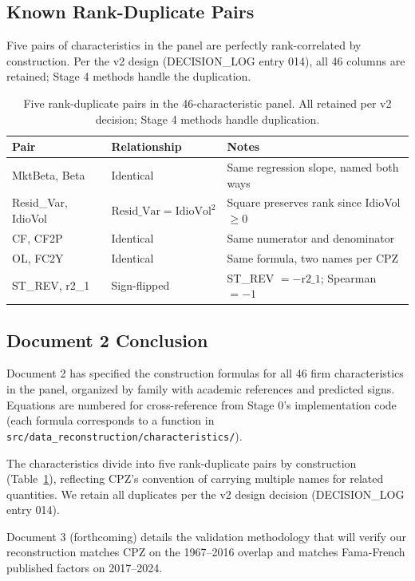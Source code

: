 \subsection{Known Rank-Duplicate Pairs}
\label{subsec:stage0-duplicates}

Five pairs of characteristics in the panel are perfectly rank-correlated
by construction. Per the v2 design (DECISION\_LOG entry 014), all 46
columns are retained; Stage 4 methods handle the duplication.

\begin{table}[!ht]
\centering
\small
\begin{tabular}{lll}
\toprule
\textbf{Pair} & \textbf{Relationship} & \textbf{Notes} \\
\midrule
MktBeta, Beta & Identical & Same regression slope, named both ways \\
Resid\_Var, IdioVol & $\mathrm{Resid\_Var} = \mathrm{IdioVol}^2$ &
   Square preserves rank since IdioVol $\ge 0$ \\
CF, CF2P & Identical & Same numerator and denominator \\
OL, FC2Y & Identical & Same formula, two names per CPZ \\
ST\_REV, r2\_1 & Sign-flipped & ST\_REV $= -\mathrm{r2\_1}$;
   Spearman $=-1$ \\
\bottomrule
\end{tabular}
\caption{Five rank-duplicate pairs in the 46-characteristic panel.
All retained per v2 decision; Stage 4 methods handle duplication.}
\label{tab:duplicates}
\end{table}

\subsection{Document 2 Conclusion}

Document 2 has specified the construction formulas for all 46 firm
characteristics in the panel, organized by family with academic
references and predicted signs. Equations are numbered for cross-reference
from Stage 0's implementation code (each formula corresponds to a
function in \texttt{src/data\_reconstruction/characteristics/}).

The characteristics divide into five rank-duplicate pairs by
construction (Table~\ref{tab:duplicates}), reflecting CPZ's convention
of carrying multiple names for related quantities. We retain all
duplicates per the v2 design decision (DECISION\_LOG entry 014).

Document 3 (forthcoming) details the validation methodology that will
verify our reconstruction matches CPZ on the 1967--2016 overlap and
matches Fama-French published factors on 2017--2024.
